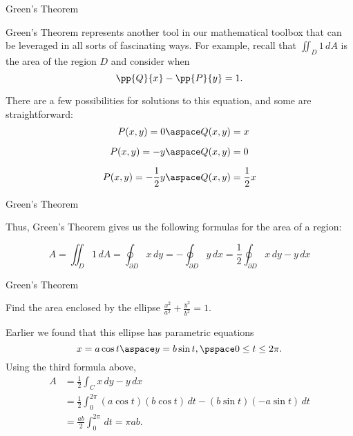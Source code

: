 \documentclass[11pt,english,
handout
]{beamer}
\begin{document}
\begin{frame}[t]{Green's Theorem}
\small

Green's Theorem represents another tool in our mathematical toolbox that can be leveraged in all sorts of fascinating ways. \pause For example, recall that $\displaystyle \iint_D1\,dA$ is the area of the region $D$ and consider when
\[
\pp{Q}{x}-\pp{P}{y}=1.
\]\pause

There are a few possibilities for solutions to this equation, and some are straightforward:
\begin{align*}
P(x,y)=0&\aspace Q(x,y)=x\\[2mm]
P(x,y)=-y&\aspace Q(x,y)=0\\[2mm]
P(x,y)=-\frac{1}{2}y&\aspace Q(x,y)=\frac{1}{2}x
\end{align*}
\end{frame}









\begin{frame}{Green's Theorem}
\small

Thus, Green's Theorem gives us the following formulas for the area of a region:


\[
\boxed{A=\iint_D1\,dA=\oint_{\partial D}x\,dy=-\oint_{\partial D}y\,dx=\frac{1}{2}\oint_{\partial D}x\,dy-y\,dx}
\]
\end{frame}










\begin{frame}[t]{Green's Theorem}
\small
\begin{example}
Find the area enclosed by the ellipse $\frac{x^2}{a^2}+\frac{y^2}{b^2}=1$.\pause 

\lspace
Earlier we found that this ellipse has parametric equations
\[
x=a\cos t \aspace y=b\sin t,\pspace 0\leq t\leq 2\pi. 
\]\pause
Using the third formula above,
\begin{align*}
A&=\frac{1}{2}\int_Cx\,dy-y\,dx\\[2mm]
&=\frac{1}{2}\int_0^{2\pi}(a\cos t)(b\cos t)\,dt-(b\sin t)(-a\sin t)\,dt\\[2mm]
&=\frac{ab}{2}\int_0^{2\pi}\,dt=\pi ab.
\end{align*}
\end{example}
\end{frame}
\end{document}
